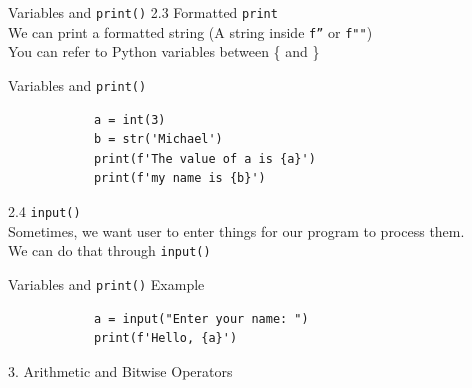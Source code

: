 \documentclass{beamer}
\begin{document}
    \begin{frame}{Variables and \texttt{print()}}
        \color{blue} \Large 2.3 Formatted \texttt{print} \\
        \color{black} \normalsize \vskip 10pt
        We can print a formatted string (A string inside \texttt{f''} or \texttt{f""})\\
        You can refer to Python variables between \{ and \}
    \end{frame}

    \begin{frame}[fragile]{Variables and \texttt{print()}}
        \begin{verbatim}
            a = int(3)
            b = str('Michael')
            print(f'The value of a is {a}')
            print(f'my name is {b}')
        \end{verbatim}
    \end{frame} 

    \begin{frame}
        \color{blue} \Large 2.4 \texttt{input()} \\
        \color{black} \normalsize \vskip 10pt
        Sometimes, we want user to enter things for our program to process them. \\
        We can do that through \texttt{input()}
    \end{frame}

    \begin{frame}[fragile]{Variables and \texttt{print()}}
        \color{blue} \Large Example \\
        \color{black} \normalsize \vskip 10pt
        \begin{verbatim}
            a = input("Enter your name: ")
            print(f'Hello, {a}')
        \end{verbatim}
    \end{frame} 

    
    \begin{frame}[plain,c]
        \begin{center}
            {\color{blue} \LARGE 3. Arithmetic and Bitwise Operators}
        \end{center}
        
    \end{frame}
    
\end{document}
